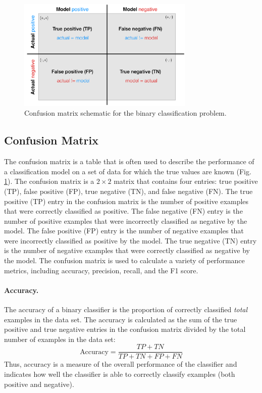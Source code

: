\documentclass{article}[12pt]
\begin{document}
\begin{figure}
    \centering
	\includegraphics[width=0.75\textwidth]{./figs/Fig-BinaryConfusionMatrix.pdf}
	\caption{Confusion matrix schematic for the binary classification problem.}\label{fig:binaryconfusionmatrx}
\end{figure}

\subsection{Confusion Matrix}
The confusion matrix is a table that is often used to describe the performance of a classification model on a set of data for which the true values are known (Fig. \ref{fig:binaryconfusionmatrx}).
The confusion matrix is a $2\times{2}$ matrix that contains four entries: true positive (TP), false positive (FP), true negative (TN), and false negative (FN).
The true positive (TP) entry in the confusion matrix is the number of positive examples that were correctly classified as positive.
The false negative (FN) entry is the number of positive examples that were incorrectly classified as negative by the model.
The false positive (FP) entry is the number of negative examples that were incorrectly classified as positive by the model.
The true negative (TN) entry is the number of negative examples that were correctly classified as negative by the model.
The confusion matrix is used to calculate a variety of performance metrics, including accuracy, precision, recall, and the F1 score.

\paragraph*{Accuracy.}
The accuracy of a binary classifier is the proportion of correctly classified \textit{total} examples in the data set.
The accuracy is calculated as the sum of the true positive and true negative entries in the confusion matrix divided by the total number of examples in the data set:
\begin{equation*}
    \text{Accuracy} = \frac{TP + TN}{TP + TN + FP + FN}
\end{equation*}
Thus, accuracy is a measure of the overall performance of the classifier and indicates how well the classifier is able to correctly classify examples (both positive and negative).
\end{document}
